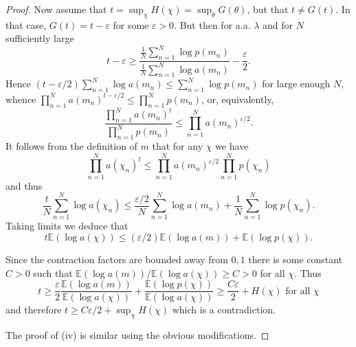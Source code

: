 \documentclass[10pt,a4paper]{amsart}
\newcommand{\ee}{{\mathbb E}}
\begin{document}
\begin{proof}
Now assume that $t=\sup_{\chi }H(\chi )=\sup_{\theta }G(\theta )$, but that $t\neq G(t)$. 
In that case, $G(t)=t-\varepsilon $ for some $\varepsilon >0$.
But then for a.a. $\lambda $ and for $N$ sufficiently large 
\begin{equation*}
   t-\varepsilon \geq 
    \frac{\frac{1}{N}\sum_{n=1}^{N}\log p(m_{n})}{\frac{1}{N}\sum_{n=1}^{N}\log a(m_{n})}
     -\frac{\varepsilon }{2}.
\end{equation*}
Hence $(t-\varepsilon /2)\sum_{n=1}^{N}\log a(m_{n})\leq \sum_{n=1}^{N}\log p(m_{n})$ 
for large enough $N,$ whence $\prod_{n=1}^{N}a(m_{n})^{t-\varepsilon /2}\leq \prod_{n=1}^{N}p(m_{n})$, 
or, equivalently,
\begin{equation*}
    \frac{\prod_{n=1}^{N}a(m_{n})^{t}}{\prod_{n=1}^{N}p(m_{n})}
        \leq
        \prod_{n=1}^{N}a(m_{n})^{\varepsilon /2}.
\end{equation*}
It follows from the definition of $m$ that for any $\chi $ we have 
\begin{equation*}
         \prod_{n=1}^{N}a(\chi _{n})^{t}\leq \prod_{n=1}^{N}a(m_{n})^{\varepsilon/2}\prod_{n=1}^{N}p(\chi _{n})
\end{equation*}
and thus
\begin{equation*}
     \frac{t}{N}\sum_{n=1}^{N}\log a(\chi _{n})\leq 
         \frac{\varepsilon /2}{N}\sum_{n=1}^{N}\log a(m_{n})+
        \frac{1}{N}\sum_{n=1}^{N}\log p(\chi _{n}).
\end{equation*}
Taking limits we deduce that 
\begin{equation*}
     t\ee(\log a(\chi ))\leq (\varepsilon /2)\ee(\log a(m))+\ee(\log p(\chi )).
\end{equation*}

Since the contraction factors are bounded away from $0,1$ there is some constant $C>0$ 
such that $\ee(\log a(m))/\ee(\log a(\chi))\geq C > 0$ for all $\chi$.
Thus 
\begin{equation*}
     t\geq 
       \frac{\varepsilon }{2}\frac{\ee(\log a(m))}{\ee(\log a(\chi ))}+
       \frac{\ee(\log p(\chi ))}{\ee(\log a(\chi ))}
    \geq   \frac{C\varepsilon }{2}+H(\chi )\text{ for all }\chi 
\end{equation*}%
and therefore $t\geq C\varepsilon /2+\sup_{\chi }H(\chi )$ which is a
contradiction.

The proof of  (iv) is similar using the obvious modifications.
\end{proof}
\end{document}
